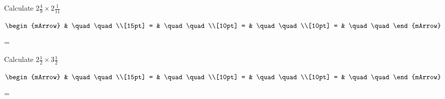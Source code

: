 \clearpage\noindent%
\begin{mtask}
   \task \begin{exercise} Calculate $ 2 \frac{4}{9} \times 2 \frac{1}{11} $
           \begin{envSolution}
             $\begin{mArrow} 
			       & \quad \quad              \\[15pt]
                 = & \quad \quad              \\[10pt]
		   		 = & \quad \quad              \\[10pt]
				 = & \quad \quad 
              \end{mArrow}$
            \begin{shortsolution}  
			     =$ \quad \quad \quad \quad$
			\end{shortsolution}				 
           \end{envSolution}
         \end{exercise}
   \task \begin{exercise} Calculate $ 2 \frac{1}{2} \times 3 \frac{1}{2} $
           \begin{envSolution}
             $\begin{mArrow} 
			       & \quad \quad              \\[15pt]
                 = & \quad \quad              \\[10pt]
		   		 = & \quad \quad              \\[10pt]
				 = & \quad \quad 
              \end{mArrow}$
            \begin{shortsolution}  
			     =$ \quad \quad \quad \quad$
			\end{shortsolution}				 
           \end{envSolution}
         \end{exercise}
\end{mtask}


